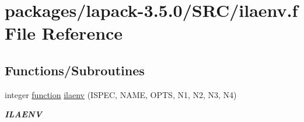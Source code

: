 \hypertarget{SRC_2ilaenv_8f}{}\section{packages/lapack-\/3.5.0/\+S\+R\+C/ilaenv.f File Reference}
\label{SRC_2ilaenv_8f}
\subsection*{Functions/\+Subroutines}
\begin{DoxyCompactItemize}
\item 
integer \hyperlink{afunc_8m_a7b5e596df91eadea6c537c0825e894a7}{function} \hyperlink{group__auxOTHERauxiliary_gab1f37bde76d31aee91a09bb2f8e87ce6}{ilaenv} (I\+S\+P\+E\+C, N\+A\+M\+E, O\+P\+T\+S, N1, N2, N3, N4)
\begin{DoxyCompactList}\small\item\em {\bfseries I\+L\+A\+E\+N\+V} \end{DoxyCompactList}\end{DoxyCompactItemize}
